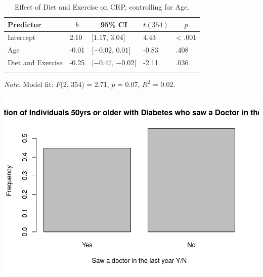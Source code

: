 \documentclass[
  man]{apa6}
\begin{document}
\begin{table}[tbp]

\begin{center}
\begin{threeparttable}

\caption{\label{tab:RQ2}Effect of Diet and Exercise on CRP, controlling for Age.}

\begin{tabular}{lllll}
\toprule
Predictor & \multicolumn{1}{c}{$b$} & \multicolumn{1}{c}{95\% CI} & \multicolumn{1}{c}{$t(354)$} & \multicolumn{1}{c}{$p$}\\
\midrule
Intercept & 2.10 & $[1.17$, $3.04]$ & 4.43 & < .001\\
Age & -0.01 & $[-0.02$, $0.01]$ & -0.83 & .408\\
Diet and Exercise & -0.25 & $[-0.47$, $-0.02]$ & -2.11 & .036\\
\bottomrule
\addlinespace
\end{tabular}

\begin{tablenotes}[para]
\normalsize{\textit{Note.} Model fit: $F$(2, 354) = 2.71, $p$ = 0.07, $R^2$ = 0.02.}
\end{tablenotes}

\end{threeparttable}
\end{center}

\end{table}

\includegraphics{NEW_Final_Groupof5_files/figure-latex/RQ3-brittany-1.pdf}
\end{document}
